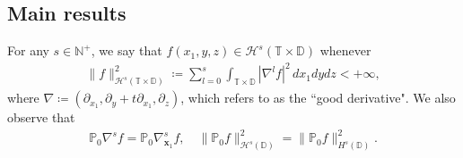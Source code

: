 \documentclass[11pt,reqno]{article}
\numberwithin{equation}{section}
\newcommand\N{{\mathbb N}}
\newcommand\T{{\mathbb T}}
\newcommand\DD{{\mathbb D}}
\newcommand\PP{{\mathbb P}}
\newcommand\HH{{\mathcal H}}
\newcommand\x{\bm{x}}
\newcommand\uu{\bm{u}}
\newcommand \tri {\coloneqq}
\let\pa=\partial
\let\na=\nabla
\begin{document}




\subsection{Main results}



For any $s\in\N^+$, we say that $f(x_1,y,z) \in \HH^s(\T\times\DD)$ whenever
\begin{align*}
	\|f\|_{\HH^s(\T\times\DD)}^2\tri \sum_{l=0}^{s}\int_{\T\times\DD}|\nabla^l f|^2\,dx_1dydz<+\infty,
\end{align*}
where $\nabla\tri (\pa_{x_1},\pa_y+t\pa_{x_1},\pa_{z})$, which refers to as the ``good derivative". We also observe that 
\begin{align}
	\PP_0\nabla^s f=\PP_0\nabla_{\x_1}^s f,\quad \|\PP_0f\|_{\HH^s(\DD)}^2=\|\PP_0f\|_{H^s(\DD)}^2.
\end{align}
\end{document}
